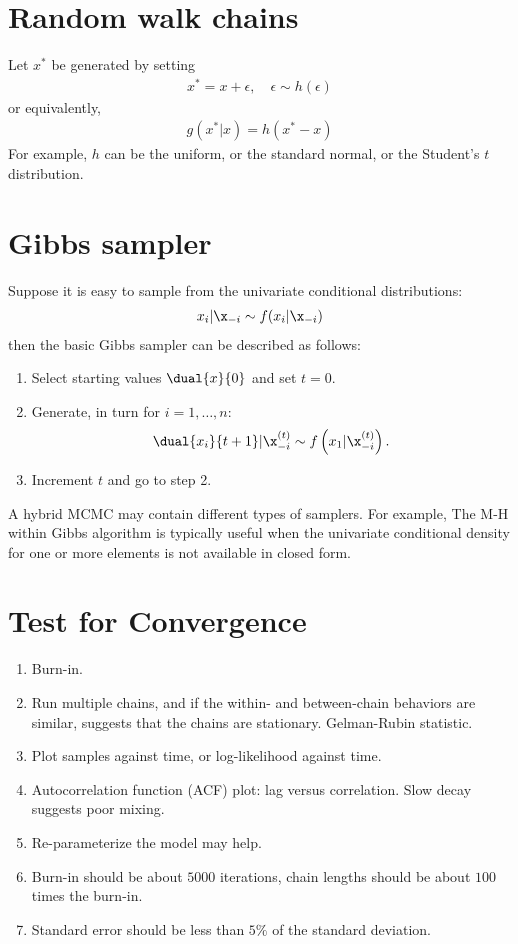 \documentclass{book}
\begin{document}
\section{Random walk chains}
Let $x^*$ be generated by setting
\begin{align}
x^* = x + \epsilon,\quad \epsilon \sim h(\epsilon)
\end{align}
or equivalently,
\begin{align}
g(x^*|x) = h(x^* - x)
\end{align}
For example, $h$ can be the uniform, or the standard normal, or the Student's $t$ distribution.


\section{Gibbs sampler}
Suppose it is easy to sample from the univariate conditional distributions:
\begin{align}
x_i | \x_{-i} \sim f(x_i | \x_{-i})
\end{align}
then the basic Gibbs sampler can be described as follows:
\begin{enumerate}
\item Select starting values $\dual{x}{0}$ and set $t=0$.
\item Generate, in turn for $i = 1, \dots, n$:
\begin{align}
\dual{x_i}{t+1} | \x_{-i}^{(t)} \sim f\left(x_1 | \x_{-i}^{(t)}\right).
\end{align}
\item Increment $t$ and go to step 2.
\end{enumerate}
A hybrid MCMC may contain different types of samplers. For example, The M-H within Gibbs algorithm is typically useful when the univariate conditional density for one or more elements is not available in closed form.

\section{Test for Convergence}
\begin{enumerate}
\item Burn-in.
\item Run multiple chains, and if the within- and between-chain behaviors are similar, suggests that the chains are stationary. Gelman-Rubin statistic.
\item Plot samples against time, or log-likelihood against time.
\item Autocorrelation function (ACF) plot: lag versus correlation. Slow decay suggests poor mixing.
\item Re-parameterize the model may help.
\item Burn-in should be about $5000$ iterations, chain lengths should be about $100$ times the burn-in.
\item Standard error should be less than $5\%$ of the standard deviation.
\end{enumerate}
\end{document}
